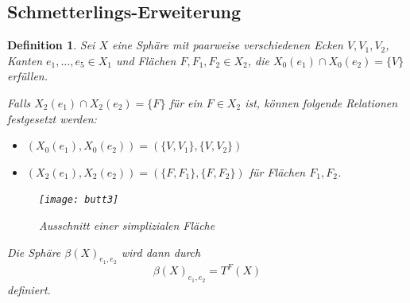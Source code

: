 \documentclass[12pt,titlepage,twoside,cleardoublepage]{article}
\theoremstyle{nummermitklammern}
\newtheorem{definition}[temp]{Definition}
\newtheorem{definition}[zahl]{Definition}
\numberwithin{equation}{section}
\begin{document}
 \subsection{Schmetterlings-Erweiterung}
 \begin{definition}
 Sei $X$ eine Sphäre mit paarweise verschiedenen Ecken $V,V_1,V_2$, Kanten  $e_1,\ldots, e_5\in X_1$ und Flächen $F,F_1,F_2\in X_2$, die $ X_0(e_1)\cap X_0(e_2) =\{V\}$ erfüllen. 
 
 Falls $X_2(e_1)\cap X_2(e_2)=\{F\}$ für ein $F\in X_2$ ist, können folgende Relationen festgesetzt werden: 
\begin{itemize}
\item $(X_0(e_1),X_0(e_2))=(\{V,V_1\},\{V,V_2\})$
\item $(X_2(e_1),X_2(e_2))=(\{F,F_1\},\{F,F_2\})$ für Flächen $F_1,F_2$.
\end{itemize}
\begin{figure}[H]
\begin{center}
\texttt{[image: butt3]}
\end{center}
\caption{Ausschnitt einer simplizialen Fläche}
\end{figure}
Die Sphäre $\beta(X)_{e_1,e_2}$ wird dann durch
\[
\beta(X)_{e_1,e_2}= T^F(X)
\]
definiert.

\end{definition}
\end{document}
